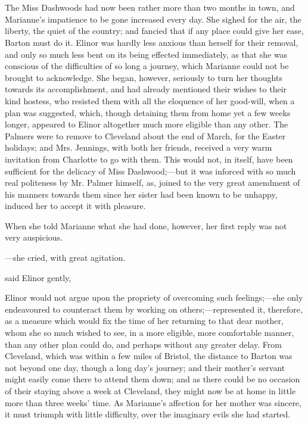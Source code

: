 \chapter{} %

The Miss Dashwoods had now been rather more than two months in town, and Marianne's impatience to be gone increased every day. She sighed for the air, the liberty, the quiet of the country; and fancied that if any place could give her ease, Barton must do it. Elinor was hardly less anxious than herself for their removal, and only so much less bent on its being effected immediately, as that she was conscious of the difficulties of so long a journey, which Marianne could not be brought to acknowledge. She began, however, seriously to turn her thoughts towards its accomplishment, and had already mentioned their wishes to their kind hostess, who resisted them with all the eloquence of her good-will, when a plan was suggested, which, though detaining them from home yet a few weeks longer, appeared to Elinor altogether much more eligible than any other. The Palmers were to remove to Cleveland about the end of March, for the Easter holidays; and Mrs. Jennings, with both her friends, received a very warm invitation from Charlotte to go with them. This would not, in itself, have been sufficient for the delicacy of Miss Dashwood;---but it was inforced with so much real politeness by Mr. Palmer himself, as, joined to the very great amendment of his manners towards them since her sister had been known to be unhappy, induced her to accept it with pleasure.

When she told Marianne what she had done, however, her first reply was not very auspicious.

---she cried, with great agitation. 

 said Elinor gently, 


Elinor would not argue upon the propriety of overcoming such feelings;---she only endeavoured to counteract them by working on others;---represented it, therefore, as a measure which would fix the time of her returning to that dear mother, whom she so much wished to see, in a more eligible, more comfortable manner, than any other plan could do, and perhaps without any greater delay. From Cleveland, which was within a few miles of Bristol, the distance to Barton was not beyond one day, though a long day's journey; and their mother's servant might easily come there to attend them down; and as there could be no occasion of their staying above a week at Cleveland, they might now be at home in little more than three weeks' time. As Marianne's affection for her mother was sincere, it must triumph with little difficulty, over the imaginary evils she had started.


